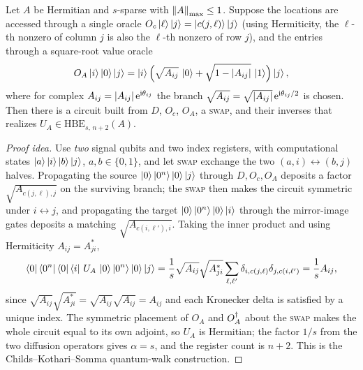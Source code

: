 \begin{theorem}
\label{thm:lec06-hbe}
Let $A$ be Hermitian and $s$-sparse with $\left\lVert A \right\rVert_{\max}\le1$. Suppose the
locations are accessed through a single oracle
$O_c\ket{\ell}\ket{j}=\ket{c(j,\ell)}\ket{j}$ (using Hermiticity, the $\ell$-th
nonzero of column $j$ is also the $\ell$-th nonzero of row $j$), and the entries
through a square-root value oracle
\begin{equation}
  O_A\ket{i}\ket{0}\ket{j}
   =\ket{i}\Bigl(\sqrt{A_{ij}}\,\ket{0}+\sqrt{1-\left\lvert A_{ij} \right\rvert}\,\ket{1}\Bigr)\ket{j},
  \label{eq:lec06-OAsqrt}
\end{equation}
where for complex $A_{ij}=\left\lvert A_{ij} \right\rvert\mathrm{e}^{\mathrm{i}\theta_{ij}}$ the branch
$\sqrt{A_{ij}}=\sqrt{\left\lvert A_{ij} \right\rvert}\,\mathrm{e}^{\mathrm{i}\theta_{ij}/2}$ is chosen. Then there is
a circuit built from $D$, $O_c$, $O_A$, a \textsc{swap}, and their inverses that
realizes $U_A\in\mathrm{HBE}_{s,\,n+2}(A)$.
\end{theorem}

\begin{proof}[Proof idea]
Use \emph{two} signal qubits and two index registers, with computational states
$\ket{a}\ket{i}\ket{b}\ket{j}$, $a,b\in\{0,1\}$, and let \textsc{swap} exchange the
two $(a,i)\leftrightarrow(b,j)$ halves. Propagating the source
$\ket{0}\ket{0^n}\ket{0}\ket{j}$ through $D,O_c,O_A$ deposits a factor
$\sqrt{A_{c(j,\ell),j}}$ on the surviving branch; the \textsc{swap} then makes the
circuit symmetric under $i\leftrightarrow j$, and propagating the target
$\ket{0}\ket{0^n}\ket{0}\ket{i}$ through the mirror-image gates deposits a matching
$\sqrt{A_{c(i,\ell'),i}}$. Taking the inner product and using Hermiticity
$A_{ij}=A_{ji}^{\ast}$,
\[
  \bra{0}\bra{0^n}\bra{0}\bra{i}\,U_A\,\ket{0}\ket{0^n}\ket{0}\ket{j}
  =\frac{1}{s}\sqrt{A_{ij}}\sqrt{A_{ji}^{\ast}}
   \sum_{\ell,\ell'}\delta_{i,c(j,\ell)}\delta_{j,c(i,\ell')}
  =\frac{1}{s}A_{ij},
\]
since $\sqrt{A_{ij}}\sqrt{A_{ji}^{\ast}}=\sqrt{A_{ij}}\sqrt{A_{ij}}=A_{ij}$ and each
Kronecker delta is satisfied by a unique index. The symmetric placement of $O_A$ and
$O_A^{\dagger}$ about the \textsc{swap} makes the whole circuit equal to its own adjoint, so
$U_A$ is Hermitian; the factor $1/s$ from the two diffusion operators gives
$\alpha=s$, and the register count is $n+2$. This is the Childs--Kothari--Somma
quantum-walk construction.
\end{proof}

